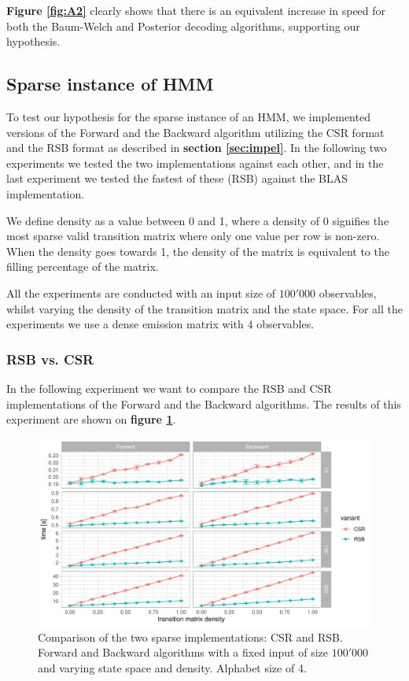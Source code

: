 \textbf{Figure \ref{fig:A2}} clearly shows that there is an equivalent increase in speed for both the Baum-Welch and Posterior decoding algorithms, supporting our hypothesis.

\subsection{Sparse instance of HMM}

To test our hypothesis for the sparse instance of an HMM, we implemented versions of the Forward and the Backward algorithm utilizing the CSR format and the RSB format as described in \textbf{section \ref{sec:impel}}. In the following two experiments we tested the two implementations against each other, and in the last experiment we tested the fastest of these (RSB) against the BLAS implementation.

We define density as a value between 0 and 1, where a density of 0 signifies the most sparse valid transition matrix where only one value per row is non-zero. When the density goes towards 1, the density of the matrix is equivalent to the filling percentage of the matrix.

All the experiments are conducted with an input size of $100'000$ observables, whilst varying the density of the transition matrix and the state space. For all the experiments we use a dense emission matrix with $4$ observables. 

\subsubsection{RSB vs. CSR}

In the following experiment we want to compare the RSB and CSR implementations of the Forward and the Backward algorithms. The results of this experiment are shown on \textbf{figure \ref{fig:B3}}. 

\begin{figure}[H]
  \centering
  \includegraphics[scale=0.85]{figures/figure_B3.pdf}
  \caption{\small{Comparison of the two sparse implementations: CSR and RSB. Forward and Backward algorithms with a fixed input of size $100'000$ and varying state space and density. Alphabet size of 4.}}
  \label{fig:B3}
\end{figure}

